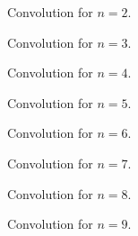 \documentclass{ee102_notes}
\begin{document}
\medskip
\begin{figure}[h]
    \centering
    \caption{Convolution for $n=2$.}
    \label{fig:conv_n2}
\end{figure}

\medskip

\begin{figure}[h!]
    \centering
    \caption{Convolution for $n=3$.}
    \label{fig:conv_n3}
\end{figure}
\begin{figure}[h!]
    \centering
    \caption{Convolution for $n=4$.}
    \label{fig:conv_n4}
\end{figure}
\begin{figure}[h!]
    \centering
    \caption{Convolution for $n=5$.}
    \label{fig:conv_n5}
\end{figure}
\begin{figure}[h!]
    \centering
    \caption{Convolution for $n=6$.}
    \label{fig:conv_n6}
\end{figure}
\begin{figure}[h!]
    \centering
    \caption{Convolution for $n=7$.}
    \label{fig:conv_n7}
\end{figure}
\medskip
\begin{figure}[h!]
    \centering
    \caption{Convolution for $n=8$.}
    \label{fig:conv_n8}
\end{figure}
\medskip
\begin{figure}[h!]
    \centering
    \caption{Convolution for $n=9$.}
    \label{fig:conv_n9}
\end{figure}
\end{document}
